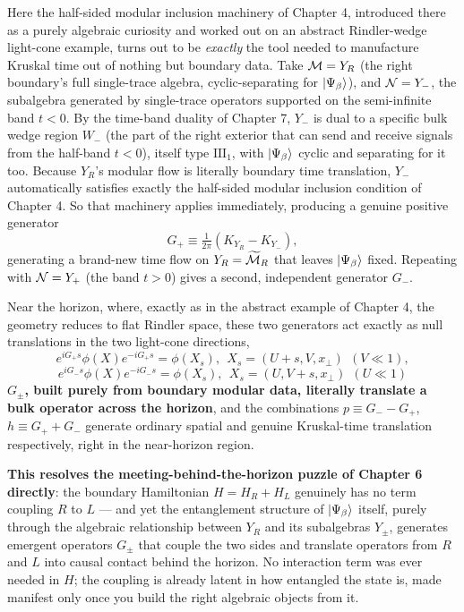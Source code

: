 Here the half-sided modular inclusion machinery of Chapter 4, introduced there as a purely algebraic
curiosity and worked out on an abstract Rindler-wedge light-cone example, turns out to be \emph{exactly} the
tool needed to manufacture Kruskal time out of nothing but boundary data. Take $\mathcal{M}=Y_R$ (the
right boundary's full single-trace algebra, cyclic-separating for $\ket{\Psi_\beta}$), and $\mathcal{N}=Y_-$, the
subalgebra generated by single-trace operators supported on the semi-infinite band $t<0$. By the
time-band duality of Chapter 7, $Y_-$ is dual to a specific bulk wedge region $W_-$ (the part of the right
exterior that can send and receive signals from the half-band $t<0$), itself type
$\mathrm{III}_1$, with $\ket{\Psi_\beta}$ cyclic and separating for it too. Because $Y_R$'s modular flow is
literally boundary time translation, $Y_-$ automatically satisfies exactly the half-sided modular inclusion
condition of Chapter 4. So that machinery applies immediately, producing a genuine positive generator
\begin{equation}
G_+\equiv\tfrac1{2\pi}(K_{Y_R}-K_{Y_-}) ,
\label{eq:Gplus}
\end{equation}
generating a brand-new time flow on $Y_R=\widetilde{\mathcal{M}}_R$
that leaves $\ket{\Psi_\beta}$ fixed. Repeating with $\mathcal{N}=Y_+$ (the band $t>0$) gives a second, independent
generator $G_-$.

Near the horizon, where, exactly as in the abstract example of Chapter 4, the geometry reduces to flat Rindler
space, these two generators act exactly as null translations in the two light-cone directions,
\[
e^{iG_+s}\phi(X)e^{-iG_+s}=\phi(X_s),\ \ X_s=(U+s,V,x_\perp)\ \ (V\ll1),
\]
\[
e^{iG_-s}\phi(X)e^{-iG_-s}=\phi(X_s),\ \ X_s=(U,V+s,x_\perp)\ \ (U\ll1)
\]
\textbf{$G_\pm$, built purely from boundary modular data, literally translate a bulk operator
across the horizon}, and the combinations $p\equiv G_--G_+$, $h\equiv G_++G_-$ generate ordinary
spatial and genuine Kruskal-time translation respectively, right in the near-horizon region.

\textbf{This resolves the meeting-behind-the-horizon puzzle of Chapter 6 directly}: the boundary
Hamiltonian $H=H_R+H_L$ genuinely has no term coupling $R$ to $L$ — and yet the entanglement structure of
$\ket{\Psi_\beta}$ itself, purely through the algebraic relationship between $Y_R$ and its subalgebras
$Y_\pm$, generates emergent operators $G_\pm$ that couple the two sides and translate operators from $R$ and
$L$ into causal contact behind the horizon. No interaction term was ever needed in $H$; the coupling is
already latent in how entangled the state is, made manifest only once you build the right algebraic objects
from it.

